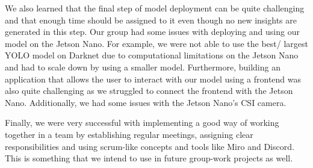 We also learned that the final step of model deployment can be quite challenging and that enough time should be assigned to it even though no new insights are generated in this step. Our group had some issues with deploying and using our model on the Jetson Nano. For example, we were not able to use the best/ largest YOLO model on Darknet due to computational limitations on the Jetson Nano and had to scale down by using a smaller model. Furthermore, building an application that allows the user to interact with our model using a frontend was also quite challenging as we struggled to connect the frontend with the Jetson Nano. Additionally, we had some issues with the Jetson Nano's CSI camera.

Finally, we were very successful with implementing a good way of working together in a team by establishing regular meetings, assigning clear responsibilities and using scrum-like concepts and tools like Miro and Discord. This is something that we intend to use in future group-work projects as well. \\

